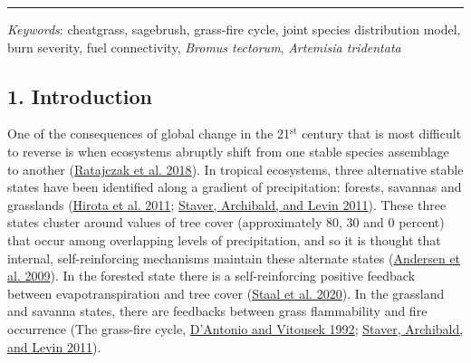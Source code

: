 \documentclass[
  12pt,
]{article}
\begin{document}
\vspace{3mm}
\hrule
\vspace{5mm}

\emph{Keywords}: cheatgrass, sagebrush, grass-fire cycle, joint species
distribution model, burn severity, fuel connectivity, \emph{Bromus
tectorum}, \emph{Artemisia tridentata}

\newpage

\hypertarget{introduction}{%
\subsection{1. Introduction}\label{introduction}}

One of the consequences of global change in the 21\(^\text{st}\) century
that is most difficult to reverse is when ecosystems abruptly shift from
one stable species assemblage to another
(\protect\hyperlink{ref-Ratajczak2018}{Ratajczak et al. 2018}). In
tropical ecosystems, three alternative stable states have been
identified along a gradient of precipitation: forests, savannas and
grasslands (\protect\hyperlink{ref-Hirota2011}{Hirota et al. 2011};
\protect\hyperlink{ref-Staver2011}{Staver, Archibald, and Levin 2011}).
These three states cluster around values of tree cover (approximately
80, 30 and 0 percent) that occur among overlapping levels of
precipitation, and so it is thought that internal, self-reinforcing
mechanisms maintain these alternate states
(\protect\hyperlink{ref-Andersen2009}{Andersen et al. 2009}). In the
forested state there is a self-reinforcing positive feedback between
evapotranspiration and tree cover
(\protect\hyperlink{ref-Staal2020}{Staal et al. 2020}). In the grassland
and savanna states, there are feedbacks between grass flammability and
fire occurrence (The grass-fire cycle,
\protect\hyperlink{ref-DAntonio1992}{D'Antonio and Vitousek 1992};
\protect\hyperlink{ref-Staver2011}{Staver, Archibald, and Levin 2011}).
\end{document}
